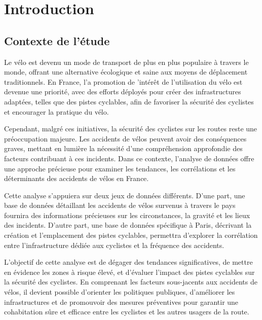 \documentclass[french,]{compterendu}
\theoremstyle{urcastyle}
\theoremstyle{remark}
\begin{document}
\vspace{1cm}

  {
  \hypersetup{linkcolor=black}
  \setcounter{tocdepth}{2}
  \pagebreak
  \tableofcontents
  }

\pagebreak
\normalsize



\hypertarget{introduction}{%
\section{Introduction}\label{introduction}}

\hypertarget{contexte-de-luxe9tude}{%
\subsection{Contexte de l'étude}\label{contexte-de-luxe9tude}}

Le vélo est devenu un mode de transport de plus en plus populaire à travers le monde, offrant une alternative écologique et saine aux moyens de déplacement traditionnels. En France, l'a promotion de 'intérêt de l'utilisation du vélo est devenue une priorité, avec des efforts déployés pour créer des infrastructures adaptées, telles que des pistes cyclables, afin de favoriser la sécurité des cyclistes et encourager la pratique du vélo.

Cependant, malgré ces initiatives, la sécurité des cyclistes sur les routes reste une préoccupation majeure. Les accidents de vélos peuvent avoir des conséquences graves, mettant en lumière la nécessité d'une compréhension approfondie des facteurs contribuant à ces incidents. Dans ce contexte, l'analyse de données offre une approche précieuse pour examiner les tendances, les corrélations et les déterminants des accidents de vélos en France.

Cette analyse s'appuiera sur deux jeux de données différents. D'une part, une base de données détaillant les accidents de vélos survenus à travers le pays fournira des informations précieuses sur les circonstances, la gravité et les lieux des incidents. D'autre part, une base de données spécifique à Paris, décrivant la création et l'emplacement des pistes cyclables, permettra d'explorer la corrélation entre l'infrastructure dédiée aux cyclistes et la fréquence des accidents.

L'objectif de cette analyse est de dégager des tendances significatives, de mettre en évidence les zones à risque élevé, et d'évaluer l'impact des pistes cyclables sur la sécurité des cyclistes. En comprenant les facteurs sous-jacents aux accidents de vélos, il devient possible d'orienter les politiques publiques, d'améliorer les infrastructures et de promouvoir des mesures préventives pour garantir une cohabitation sûre et efficace entre les cyclistes et les autres usagers de la route.
\end{document}
